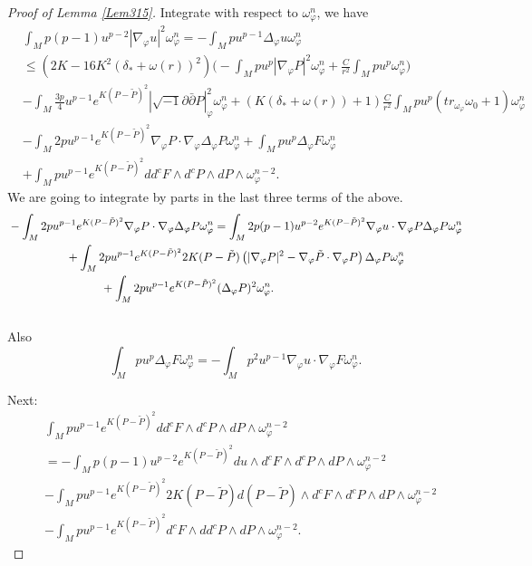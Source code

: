 \documentclass[11pt]{amsart}
\numberwithin{equation}{section}
\begin{document}
\begin{proof}[Proof of Lemma \ref{Lem315}]
Integrate with respect to $\omega_\varphi^n$, we have
\begin{equation}\label{4.135New}
\begin{split}
&\int_Mp(p-1)u^{p-2}|\nabla_{\varphi}u|^2\omega_{\varphi}^n=-\int_Mpu^{p-1}\Delta_{\varphi}u\omega_{\varphi}^n\\
&\le (2K-16K^2(\delta_*+\omega(r))^2)\bigg(-\int_Mpu^p|\nabla_{\varphi}P|^2\omega_{\varphi}^n+\frac{C}{r^2}\int_Mpu^p\omega_{\varphi}^n\bigg)\\
&-\int_M\frac{3p}{4}u^{p-1}e^{K(P-\tilde{P})^2}|\sqrt{-1}\partial\bar{\partial}P|^2_{\varphi}\omega_{\varphi}^n+(K(\delta_*+\omega(r))+1)\frac{C}{r^2}\int_Mpu^p(tr_{\omega_{\varphi}}\omega_0+1)\omega_{\varphi}^n\\
&-\int_M2pu^{p-1}e^{K(P-\tilde{P})^2}\nabla_{\varphi}P\cdot \nabla_{\varphi}\Delta_{\varphi}P\omega_{\varphi}^n+\int_Mpu^p\Delta_{\varphi}F\omega_{\varphi}^n\\
&+\int_Mpu^{p-1}e^{K(P-\tilde{P})^2}dd^cF\wedge d^cP\wedge dP\wedge \omega_{\varphi}^{n-2}.
\end{split}
\end{equation}
We are going to integrate by parts in the last three terms of the above.
\begin{align}\label{4.135N}
	&-\int_M2pu^{p-1}e^{K(P-\tilde P)^2}\nabla_{\varphi}P\cdot \nabla_{\varphi}\Delta_{\varphi}P\omega_{\varphi}^n =\int_M2p(p-1)u^{p-2}e^{K(P-\tilde P)^2}\nabla_{\varphi}u\cdot \nabla_{\varphi}P\Delta_{\varphi}P\omega_{\varphi}^n \notag \\
	&\quad\qquad\qquad +\int_M2pu^{p-1}e^{K(P-\tilde P)^2}2K (P-\tilde P)\left( |\nabla_{\varphi}P|^2-\nabla_\varphi\tilde P\cdot\nabla_\varphi P \right) \Delta_{\varphi}P\omega_{\varphi}^n \notag\\
	&\qquad\qquad\qquad\qquad + \int_M2pu^{p-1}e^{K(P-\tilde P)^2}(\Delta_{\varphi}P)^2\omega_{\varphi}^n.
\end{align}\\
Also
\begin{equation}\label{4.136}
\int_Mpu^p\Delta_{\varphi}F\omega_{\varphi}^n=-\int_Mp^2u^{p-1}\nabla_{\varphi}u\cdot \nabla_{\varphi}F\omega_{\varphi}^n.
\end{equation}

Next:
\begin{equation}\label{4.137}
\begin{split}
&\int_Mpu^{p-1}e^{K(P-\tilde{P})^2}dd^cF\wedge d^cP\wedge dP\wedge \omega_{\varphi}^{n-2}\\
&=-\int_Mp(p-1)u^{p-2}e^{K(P-\tilde{P})^2}du\wedge d^cF\wedge d^cP\wedge dP\wedge \omega_{\varphi}^{n-2}\\
&-\int_Mpu^{p-1}e^{K(P-\tilde{P})^2}2K(P-\tilde{P})d(P-\tilde{P})\wedge d^cF\wedge d^cP\wedge dP\wedge \omega_{\varphi}^{n-2}\\
&-\int_Mpu^{p-1}e^{K(P-\tilde{P})^2}d^cF\wedge dd^cP\wedge dP\wedge \omega_{\varphi}^{n-2}.
\end{split}
\end{equation}


\end{proof}
\end{document}
